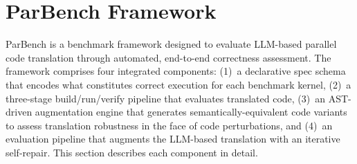 \documentclass{article}
\begin{document}

\section{ParBench Framework}
\label{sec:framework}

ParBench is a benchmark framework designed to evaluate LLM-based parallel code translation through automated, end-to-end correctness assessment. The framework comprises four integrated components: (1)~a declarative spec schema that encodes what constitutes correct execution for each benchmark kernel, (2)~a three-stage build/run/verify pipeline that evaluates translated code, (3)~an AST-driven augmentation engine that generates semantically-equivalent code variants to assess translation robustness in the face of code perturbations, and (4)~an evaluation pipeline that augments the LLM-based translation with an iterative self-repair. This section describes each component in detail.
\end{document}
